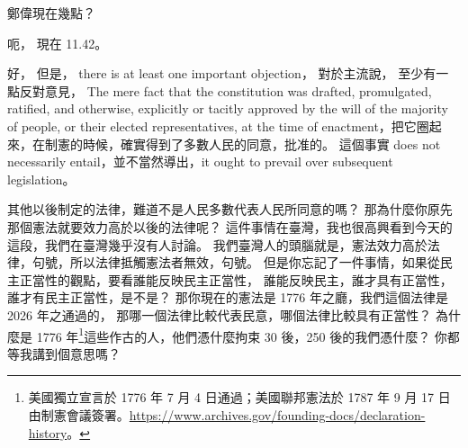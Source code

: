\hypertarget{w02:cue:1935}{}鄭偉現在幾點？

\hypertarget{w02:cue:1936}{}呃，
\hypertarget{w02:cue:1937}{}現在 11.42。

\hypertarget{w02:cue:1938}{}好，
\hypertarget{w02:cue:1939}{}但是，
\hypertarget{w02:cue:1940}{}there is at least one important objection，
\hypertarget{w02:cue:1941}{}對於主流說，
\hypertarget{w02:cue:1942}{}至少有一點反對意見，
\hypertarget{w02:cue:1943}{}The mere fact that the constitution was drafted, promulgated, ratified, and otherwise, explicitly or tacitly approved by the will of the majority of people, or their elected representatives, at the time of enactment，把它圈起來，在制憲的時候，確實得到了多數人民的同意，批准的。
\hypertarget{w02:cue:1944}{}這個事實 does not necessarily entail，並不當然導出，it ought to prevail over subsequent legislation。

\hypertarget{w02:cue:1945}{}其他以後制定的法律，難道不是人民多數代表人民所同意的嗎？
\hypertarget{w02:cue:1946}{}那為什麼你原先那個憲法就要效力高於以後的法律呢？
\hypertarget{w02:cue:1947}{}這件事情在臺灣，我也很高興看到今天的這段，我們在臺灣幾乎沒有人討論。
\hypertarget{w02:cue:1948}{}我們臺灣人的頭腦就是，憲法效力高於法律，句號，所以法律抵觸憲法者無效，句號。
\hypertarget{w02:cue:1949}{}但是你忘記了一件事情，如果從民主正當性的觀點，要看誰能反映民主正當性，
\hypertarget{w02:cue:1950}{}誰能反映民主，誰才具有正當性，誰才有民主正當性，是不是？
\hypertarget{w02:cue:1951}{}那你現在的憲法是 1776 年之廳，我們這個法律是 2026 年之通過的，
\hypertarget{w02:cue:1952}{}那哪一個法律比較代表民意，哪個法律比較具有正當性？
\hypertarget{w02:cue:1953}{}為什麼是 1776 年\footnote{美國獨立宣言於 1776 年 7 月 4 日通過；美國聯邦憲法於 1787 年 9 月 17 日由制憲會議簽署。\url{https://www.archives.gov/founding-docs/declaration-history}。}這些作古的人，他們憑什麼拘束 30 後，250 後的我們憑什麼？
\hypertarget{w02:cue:1954}{}你都等我講到個意思嗎？

